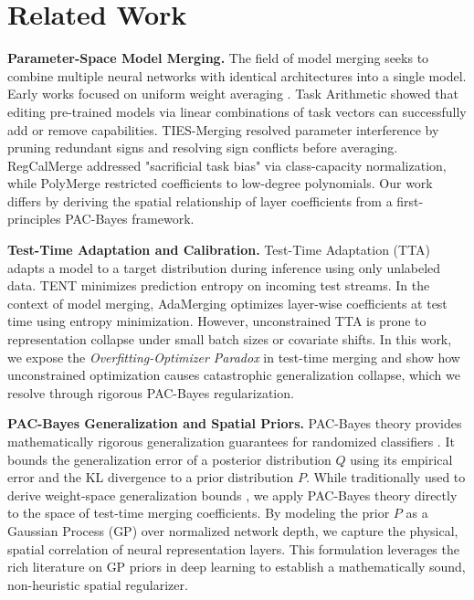 \section{Related Work}
\label{sec:related}

\textbf{Parameter-Space Model Merging.} The field of model merging seeks to
combine multiple neural networks with identical architectures into a single
model. Early works focused on uniform weight averaging \cite{fedavg,
wortsman2022model}. Task Arithmetic \cite{ilharco2022editing} showed that
editing pre-trained models via linear combinations of task vectors can
successfully add or remove capabilities. TIES-Merging \cite{yadav2023ties}
resolved parameter interference by pruning redundant signs and resolving sign
conflicts before averaging. RegCalMerge \cite{trial2_submission1} addressed
"sacrificial task bias" via class-capacity normalization, while PolyMerge
\cite{trial2_submission3} restricted coefficients to low-degree polynomials. Our
work differs by deriving the spatial relationship of layer coefficients from a
first-principles PAC-Bayes framework.

\textbf{Test-Time Adaptation and Calibration.} Test-Time Adaptation (TTA) adapts
a model to a target distribution during inference using only unlabeled data.
TENT \cite{tent} minimizes prediction entropy on incoming test streams. In the
context of model merging, AdaMerging \cite{yang2024adamerging} optimizes
layer-wise coefficients at test time using entropy minimization. However,
unconstrained TTA is prone to representation collapse under small batch sizes or
covariate shifts. In this work, we expose the \emph{Overfitting-Optimizer
Paradox} in test-time merging and show how unconstrained optimization causes
catastrophic generalization collapse, which we resolve through rigorous
PAC-Bayes regularization.

\textbf{PAC-Bayes Generalization and Spatial Priors.} PAC-Bayes theory provides
mathematically rigorous generalization guarantees for randomized classifiers
\cite{mcallester1999some, catoni2007pac}. It bounds the generalization error of
a posterior distribution $Q$ using its empirical error and the KL divergence to
a prior distribution $P$. While traditionally used to derive weight-space
generalization bounds \cite{dziugaite2017computing}, we apply PAC-Bayes theory
directly to the space of test-time merging coefficients. By modeling the prior
$P$ as a Gaussian Process (GP) over normalized network depth, we capture the
physical, spatial correlation of neural representation layers. This formulation
leverages the rich literature on GP priors in deep learning
\cite{neal1996priors, rasmussen2006gaussian} to establish a mathematically
sound, non-heuristic spatial regularizer.

